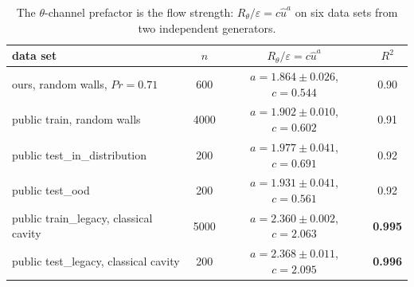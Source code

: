 \documentclass[preprint,11pt,a4paper,times,doubleblind]{elsarticle}
\begin{document}
\begin{table}[htbp]
\centering
\small
\caption{The $\theta$-channel prefactor is the flow strength: $R_\theta/\varepsilon=c\hat u^a$ on
six data sets from two independent generators.}
\label{tab:uhat}
\begin{tabular}{@{}lccc@{}}
\toprule
data set & $n$ & $R_\theta/\varepsilon=c\hat u^a$ & $R^2$\\
\midrule
ours, random walls, $Pr=0.71$ & 600 & $a=1.864\pm0.026$, $c=0.544$ & 0.90\\
public train, random walls & 4000 & $a=1.902\pm0.010$, $c=0.602$ & 0.91\\
public test\_in\_distribution & 200 & $a=1.977\pm0.041$, $c=0.691$ & 0.92\\
public test\_ood & 200 & $a=1.931\pm0.041$, $c=0.561$ & 0.92\\
public train\_legacy, classical cavity & 5000 & $a=2.360\pm0.002$, $c=2.063$ & \textbf{0.995}\\
public test\_legacy, classical cavity & 200 & $a=2.368\pm0.011$, $c=2.095$ & \textbf{0.996}\\
\bottomrule
\end{tabular}
\end{table}
\end{document}
